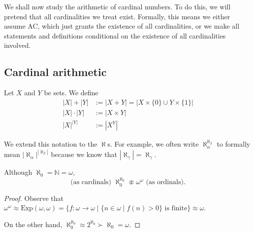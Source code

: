 \documentclass{whrartcl}
\newcommand{\NN}{\mathbb{N}}
\newcommand{\Exp}{\text{Exp}}
\newcommand{\abs}[1]{|#1|}
\begin{document}
\begin{remark}
  We shall now study the arithmetic of cardinal numbers. To do this, we will
  pretend that all cardinalities we treat exist. Formally, this means we either
  assume AC, which just grants the existence of all cardinalities, or we make
  all statements and definitions conditional on the existence of all
  cardinalities involved.
\end{remark}

\subsection{Cardinal arithmetic}

\begin{definition}
   Let $X$ and $Y$ be sets. We define
   \begin{align*}
     \abs{X} + \abs{Y} & := \abs{X + Y} = \abs{X \times \{0\} \cup Y \times \{1\}} \\
     \abs{X} \cdot \abs{Y} & := \abs{X \times Y} \\
     \abs{X}^{\abs{Y}} & := \abs{X^Y}
   \end{align*}
\end{definition}

\begin{remark}
  We extend this notation to the $\aleph$s. For example, we often write
  $\aleph_\alpha^{\aleph_\beta}$ to formally mean
  $\abs{\aleph_\alpha}^{\abs{\aleph_\beta}}$ because we know that
  $\abs{\aleph_\gamma} = \aleph_\gamma$.
\end{remark}

\begin{lemma} Although $\aleph_0 = \NN = \omega$,
  \[
    \text{(as cardinals)  } \aleph_0^{\aleph_0} \not\approx \omega^\omega
    \text{  (as ordinals)}.
  \]
\end{lemma}
\begin{proof}
  Observe that $\omega^\omega \approx \Exp(\omega, \omega) = \{f : \omega \to
  \omega \mid \{n \in \omega \mid f(n) > 0\} \text{ is finite}\} \approx \omega$.

  On the other hand, $\aleph_0^{\aleph_0} \approx 2^{\aleph_0} \succ \aleph_0 = \omega$.
\end{proof}
\end{document}
